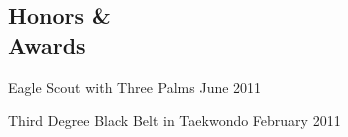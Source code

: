\documentclass[letterpaper,margin,line,11pt]{resume}
\begin{document}
\begin{resume}
\section{\mysidestyle Honors \& \\ Awards}
    \begin{asparablank}
        \item Eagle Scout with Three Palms \hfill June 2011
        \item Third Degree Black Belt in Taekwondo \hfill February 2011
    \end{asparablank}

\end{resume}
\end{document}
